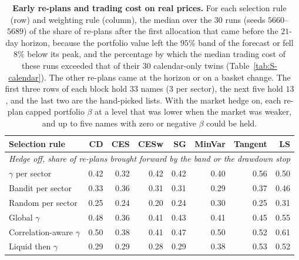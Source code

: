 \begin{table}[H]
\centering
\small
\setlength{\tabcolsep}{4pt}
\caption{\textbf{Early re-plans and trading cost on real prices.} For each selection rule (row) and weighting rule
(column), the median over the $30$ runs (seeds $5660$--$5689$) of the share of re-plans after the first allocation
that came before the $21$-day horizon, because the portfolio value left the $95\%$ band of the forecast or fell
$8\%$ below its peak, and the percentage by which the median trading cost of these runs exceeded that of their $30$
calendar-only twins (Table~\ref{tab:S-calendar}). The other re-plans came at the horizon or on a basket change. The
first three rows of each block hold $33$ names ($3$ per sector), the next five hold $13$, and the last two are the
hand-picked lists. With the market hedge on, each re-plan capped portfolio $\beta$ at a level that was lower when the market was weaker, and up to
five names with zero or negative $\beta$ could be held.}
\label{tab:S-replans}
\begin{tabular}{l*{7}{r}}
\toprule
Selection rule & CD & CES & CESw & SG & MinVar & Tangent & LS \\
\midrule
\multicolumn{8}{l}{\emph{Hedge off, share of re-plans brought forward by the band or the drawdown stop}} \\
$\gamma$ per sector & 0.42 & 0.32 & 0.42 & 0.42 & 0.40 & 0.56 & 0.50 \\
Bandit per sector & 0.33 & 0.36 & 0.31 & 0.31 & 0.29 & 0.37 & 0.46 \\
Random per sector & 0.25 & 0.24 & 0.20 & 0.24 & 0.30 & 0.25 & 0.31 \\
\addlinespace[2pt]
Global $\gamma$ & 0.48 & 0.36 & 0.41 & 0.43 & 0.41 & 0.45 & 0.55 \\
Correlation-aware $\gamma$ & 0.50 & 0.38 & 0.41 & 0.47 & 0.50 & 0.52 & 0.61 \\
Liquid then $\gamma$ & 0.29 & 0.29 & 0.28 & 0.29 & 0.38 & 0.53 & 0.52 \\

\end{tabular}
\end{table}
